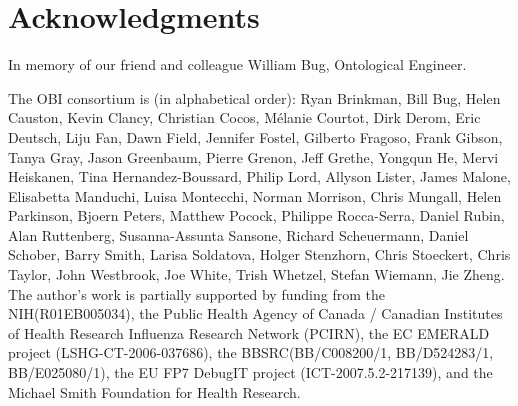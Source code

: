 \documentclass{ao2e}%
\begin{document}

\section*{Acknowledgments}

In memory of our friend and colleague William Bug, Ontological Engineer. 

The OBI consortium is (in alphabetical order): Ryan Brinkman, Bill Bug, Helen Causton, Kevin Clancy, Christian Cocos, M\'elanie Courtot, Dirk Derom, Eric Deutsch, Liju Fan, Dawn Field, Jennifer Fostel, Gilberto Fragoso, Frank Gibson, Tanya Gray, Jason Greenbaum, Pierre Grenon, Jeff Grethe, Yongqun He, Mervi Heiskanen, Tina Hernandez-Boussard, Philip Lord, Allyson Lister, James Malone, Elisabetta Manduchi, Luisa Montecchi, Norman Morrison, Chris Mungall, Helen Parkinson, Bjoern Peters, Matthew Pocock, Philippe Rocca-Serra, Daniel Rubin, Alan Ruttenberg, Susanna-Assunta Sansone, Richard Scheuermann, Daniel Schober, Barry Smith, Larisa Soldatova, Holger Stenzhorn, Chris Stoeckert, Chris Taylor, John Westbrook,  Joe White, Trish Whetzel, Stefan Wiemann, Jie Zheng. 
The author's work is partially supported by funding from the NIH(R01EB005034),  the Public Health Agency of Canada / Canadian Institutes of Health Research Influenza Research Network (PCIRN), the EC EMERALD project (LSHG-CT-2006-037686), the BBSRC(BB/C008200/1, BB/D524283/1, BB/E025080/1), the EU FP7 DebugIT project (ICT-2007.5.2-217139), and the Michael Smith Foundation for Health Research.
\end{document}
